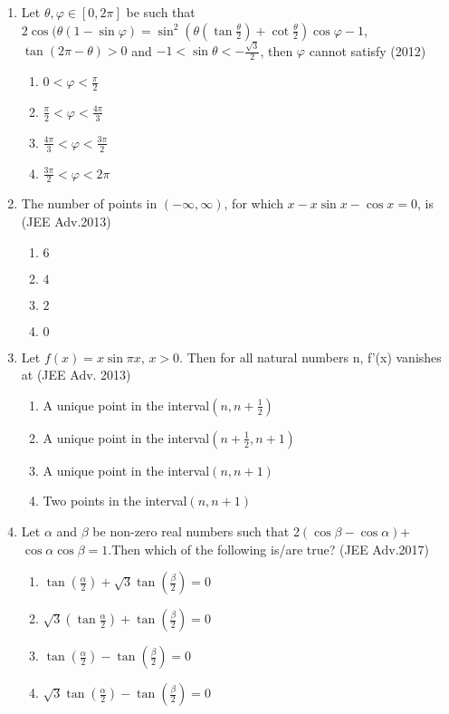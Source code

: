 \documentclass[journal,12pt,twocolumn]{IEEEtran}
\theoremstyle{remark}
\begin{document}
\begin{enumerate}
\item Let $\theta, \varphi \in [0,2\pi]$ be such that $2 \cos(\theta(1-\sin \varphi)= 
\sin^2(\theta(\tan\frac{\theta}{2})+\cot\frac{\theta}{2})\cos \varphi-1$,$\tan(2\pi-\theta)>0$ and $-1<\sin{\theta}<-\frac{\sqrt{3}}{2}$, then $\varphi$ cannot satisfy \hfill(2012)
\begin{enumerate}
    \item $0<\varphi<\frac{\pi}{2}$
    \item $\frac{\pi}{2}<\varphi<\frac{4\pi}{3}$
    \item $\frac{4\pi}{3}<\varphi<\frac{3\pi}{2}$
    \item $\frac{3\pi}{2}<\varphi<2\pi$
\end{enumerate}
\item The number of points in $(-\infty, \infty)$, for which $x - x \sin x - \cos x = 0$, is \hfill(JEE Adv.2013)
\begin{enumerate}
    \item $6$
    \item $4$
    \item $2$
    \item $0$
\end{enumerate}
\item Let $f(x)=x\sin\pi x $, $ x>0 $. Then for all  natural numbers n, f'(x) vanishes at
\hfill(JEE Adv. 2013)
\begin{enumerate}
    \item A unique point in the interval$(n,n+\frac{1}{2})$
    \item A unique point in the interval$(n+\frac{1}{2},n+1)$
    \item A unique point in the interval$(n,n+1)$
    \item Two points in the interval$(n,n+1)$
\end{enumerate}
\item Let $\alpha$ and $\beta$ be non-zero real numbers such that 2$(\cos \beta - \cos \alpha)$+$\cos \alpha \cos \beta=1$.Then which of the following is/are true? \hfill(JEE Adv.2017)
\begin{enumerate}
    \item $\tan{(\frac{\alpha}{2})+\sqrt{3}\tan(\frac{\beta}{2})}=0$
    \item $\sqrt{3}(\tan{\frac{\alpha}{2}})+\tan({\frac{\beta}{2}})=0$
    \item $\tan{(\frac{\alpha}{2})}-\tan{(\frac{\beta}{2})}=0$
    \item $\sqrt{3}\tan{(\frac{\alpha}{2})}-\tan{(\frac{\beta}{2})}=0$
\end{enumerate}


\end{enumerate}
\end{document}
